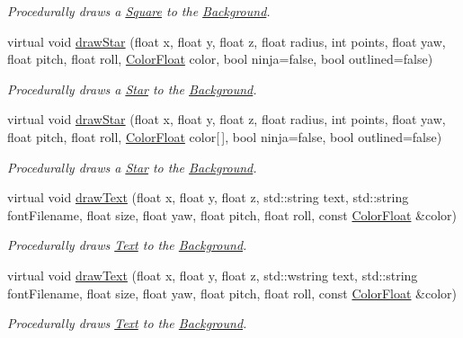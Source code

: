 \begin{DoxyCompactItemize}
\begin{DoxyCompactList}\small\item\em Procedurally draws a \hyperlink{classtsgl_1_1_square}{Square} to the \hyperlink{classtsgl_1_1_background}{Background}. \end{DoxyCompactList}\item 
virtual void \hyperlink{classtsgl_1_1_background_afe503c74d0c3e3b12e1be861ab1d4afb}{draw\+Star} (float x, float y, float z, float radius, int points, float yaw, float pitch, float roll, \hyperlink{structtsgl_1_1_color_float}{Color\+Float} color, bool ninja=false, bool outlined=false)
\begin{DoxyCompactList}\small\item\em Procedurally draws a \hyperlink{classtsgl_1_1_star}{Star} to the \hyperlink{classtsgl_1_1_background}{Background}. \end{DoxyCompactList}\item 
virtual void \hyperlink{classtsgl_1_1_background_aff95748282c3cb7f2dad401a34775a45}{draw\+Star} (float x, float y, float z, float radius, int points, float yaw, float pitch, float roll, \hyperlink{structtsgl_1_1_color_float}{Color\+Float} color\mbox{[}$\,$\mbox{]}, bool ninja=false, bool outlined=false)
\begin{DoxyCompactList}\small\item\em Procedurally draws a \hyperlink{classtsgl_1_1_star}{Star} to the \hyperlink{classtsgl_1_1_background}{Background}. \end{DoxyCompactList}\item 
virtual void \hyperlink{classtsgl_1_1_background_a89393fcf333bb982ea54e541a3adac90}{draw\+Text} (float x, float y, float z, std\+::string text, std\+::string font\+Filename, float size, float yaw, float pitch, float roll, const \hyperlink{structtsgl_1_1_color_float}{Color\+Float} \&color)
\begin{DoxyCompactList}\small\item\em Procedurally draws \hyperlink{classtsgl_1_1_text}{Text} to the \hyperlink{classtsgl_1_1_background}{Background}. \end{DoxyCompactList}\item 
virtual void \hyperlink{classtsgl_1_1_background_aa83f7bee164e0b07dbe6a6c7d74ec2c8}{draw\+Text} (float x, float y, float z, std\+::wstring text, std\+::string font\+Filename, float size, float yaw, float pitch, float roll, const \hyperlink{structtsgl_1_1_color_float}{Color\+Float} \&color)
\begin{DoxyCompactList}\small\item\em Procedurally draws \hyperlink{classtsgl_1_1_text}{Text} to the \hyperlink{classtsgl_1_1_background}{Background}. \end{DoxyCompactList}\item 

\end{DoxyCompactItemize}
